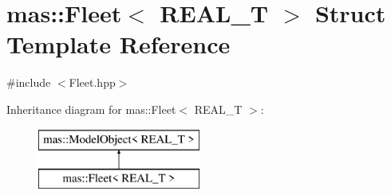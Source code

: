 \hypertarget{structmas_1_1_fleet}{\section{mas\-:\-:Fleet$<$ R\-E\-A\-L\-\_\-\-T $>$ Struct Template Reference}
\label{structmas_1_1_fleet}
}


{\ttfamily \#include $<$Fleet.\-hpp$>$}

Inheritance diagram for mas\-:\-:Fleet$<$ R\-E\-A\-L\-\_\-\-T $>$\-:\begin{figure}[H]
\begin{center}
\leavevmode
\includegraphics[height=2.000000cm]{structmas_1_1_fleet}
\end{center}
\end{figure}
